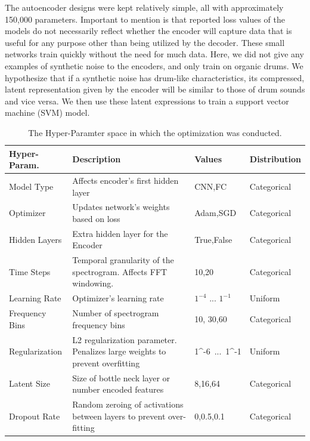 \documentclass[\main/thesis.tex]{subfiles}
\begin{document}
The autoencoder designs were kept relatively simple, all with approximately 150,000 parameters. Important to mention is that reported loss values of the models do not necessarily reflect whether the encoder will capture data that is useful for any purpose other than being utilized by the decoder. These small networks train quickly without the need for much data. Here, we did not give any examples of synthetic noise to the encoders, and only train on organic drums. We hypothesize that if a synthetic noise has drum-like characteristics, its compressed, latent representation given by the encoder will be similar to those of drum sounds and vice versa. We then use these latent expressions to train a support vector machine (SVM) model.
\begin{table}[h!]

\begin{tabular}{|p{28mm}|p{50mm}|p{21mm}|p{21mm}|}
\hline
Hyper-Param. & Description  & Values & Distribution\\ \hline
Model Type      &   Affects encoder's first hidden layer & CNN,FC & Categorical \\  \hline
Optimizer       & Updates network's weights based on loss & Adam,SGD & Categorical  \\  \hline
Hidden Layers   & Extra hidden layer for the Encoder & True,False & Categorical \\  \hline
Time Steps & Temporal granularity of the spectrogram. Affects FFT windowing. & 10,20 & Categorical  \\ \hline
Learning Rate   &    Optimizer's learning rate  & $1^{-4}$ ... $1^{-1}$ & Uniform      \\ \hline
Frequency Bins & Number of spectrogram frequency bins & 10, 30,60 & Categorical \\ \hline

Regularization  &  L2 regularization parameter. Penalizes large weights to prevent overfitting & 1^{-6}~...~1^{-1} & Uniform\\ \hline
Latent Size & Size of bottle neck layer or number encoded features & 8,16,64 & Categorical              \\ \hline
Dropout Rate & Random zeroing of activations between layers to prevent over-fitting & 0,0.5,0.1 & Categorical\\  \hline
\end{tabular}
\caption{The Hyper-Paramter space in which the optimization was conducted.}
\label{table:hyper_params}
\end{table}
\end{document}
